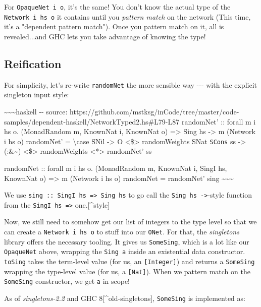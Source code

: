 \documentclass[]{article}
\begin{document}
For \texttt{OpaqueNet\ i\ o}, it's the same! You don't know the actual type of
the \texttt{Network\ i\ hs\ o} it contains until you \emph{pattern match} on the
network (This time, it's a "dependent pattern match"). Once you pattern match on
it, all is revealed...and GHC lets you take advantage of knowing the type!

\subsection{Reification}

For simplicity, let's re-write \texttt{randomNet} the more sensible way -\/-\/-
with the explicit singleton input style:

\textasciitilde{}\textasciitilde{}\textasciitilde{}haskell -\/- source:
https://github.com/mstksg/inCode/tree/master/code-samples/dependent-haskell/NetworkTyped2.hs\#L79-L87
randomNet' :: forall m i hs o. (MonadRandom m, KnownNat i, KnownNat o)
=\textgreater{} Sing hs -\textgreater{} m (Network i hs o) randomNet' =
\textbackslash{}case SNil -\textgreater{} O \textless{}\$\textgreater{}
randomWeights SNat \texttt{SCons} ss -\textgreater{} (:\&\textasciitilde{})
\textless{}\$\textgreater{} randomWeights \textless{}*\textgreater{} randomNet'
ss

randomNet :: forall m i hs o. (MonadRandom m, KnownNat i, SingI hs, KnownNat o)
=\textgreater{} m (Network i hs o) randomNet = randomNet' sing
\textasciitilde{}\textasciitilde{}\textasciitilde{}

We use \texttt{sing\ ::\ SingI\ hs\ =\textgreater{}\ Sing\ hs} to go call the
\texttt{Sing\ hs\ -\textgreater{}}-style function from the
\texttt{SingI\ hs\ =\textgreater{}} one.{[}\^{}style{]}

Now, we still need to somehow get our list of integers to the type level so that
we can create a \texttt{Network\ i\ hs\ o} to stuff into our \texttt{ONet}. For
that, the \emph{singletons} library offers the necessary tooling. It gives us
\texttt{SomeSing}, which is a lot like our \texttt{OpaqueNet} above, wrapping
the \texttt{Sing\ a} inside an existential data constructor. \texttt{toSing}
takes the term-level value (for us, an \texttt{{[}Integer{]}}) and returns a
\texttt{SomeSing} wrapping the type-level value (for us, a \texttt{{[}Nat{]}}).
When we pattern match on the \texttt{SomeSing} constructor, we get \texttt{a} in
scope!

As of \emph{singletons-2.2} and GHC 8{[}\^{}old-singletons{]}, \texttt{SomeSing}
is implemented as:
\end{document}

